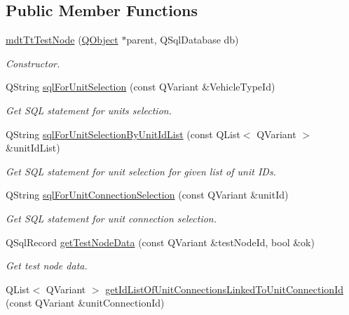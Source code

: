 \subsection*{Public Member Functions}
\begin{DoxyCompactItemize}
\item 
\hyperlink{classmdt_tt_test_node_a6a3513f05c9d76f60d7a27bd26c5ecc3}{mdt\-Tt\-Test\-Node} (\hyperlink{class_q_object}{Q\-Object} $\ast$parent, Q\-Sql\-Database db)
\begin{DoxyCompactList}\small\item\em Constructor. \end{DoxyCompactList}\item 
Q\-String \hyperlink{classmdt_tt_test_node_ae1c4ba44984fb21ec36aa4aa15207ad4}{sql\-For\-Unit\-Selection} (const Q\-Variant \&Vehicle\-Type\-Id)
\begin{DoxyCompactList}\small\item\em Get S\-Q\-L statement for units selection. \end{DoxyCompactList}\item 
Q\-String \hyperlink{classmdt_tt_test_node_a98245190a8c199d1a7238b2d1c557830}{sql\-For\-Unit\-Selection\-By\-Unit\-Id\-List} (const Q\-List$<$ Q\-Variant $>$ \&unit\-Id\-List)
\begin{DoxyCompactList}\small\item\em Get S\-Q\-L statement for unit selection for given list of unit I\-Ds. \end{DoxyCompactList}\item 
Q\-String \hyperlink{classmdt_tt_test_node_a0dcbf96a31c631f8ce62e1526688ba9f}{sql\-For\-Unit\-Connection\-Selection} (const Q\-Variant \&unit\-Id)
\begin{DoxyCompactList}\small\item\em Get S\-Q\-L statement for unit connection selection. \end{DoxyCompactList}\item 
Q\-Sql\-Record \hyperlink{classmdt_tt_test_node_ae4fbcd11c5c65892175c59ddb1cfc074}{get\-Test\-Node\-Data} (const Q\-Variant \&test\-Node\-Id, bool \&ok)
\begin{DoxyCompactList}\small\item\em Get test node data. \end{DoxyCompactList}\item 
Q\-List$<$ Q\-Variant $>$ \hyperlink{classmdt_tt_test_node_a3a0e95628454016a49202dfb7a40e871}{get\-Id\-List\-Of\-Unit\-Connections\-Linked\-To\-Unit\-Connection\-Id} (const Q\-Variant \&unit\-Connection\-Id)

\end{DoxyCompactItemize}
